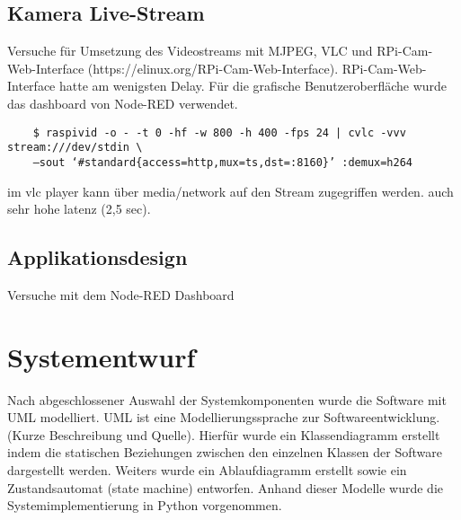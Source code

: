 \documentclass[BMR,Bachelor,ngerman]{twbook}%
\begin{document}
\subsection{Kamera Live-Stream}
Versuche für Umsetzung des Videostreams mit MJPEG, VLC und RPi-Cam-Web-Interface (https://elinux.org/RPi-Cam-Web-Interface). RPi-Cam-Web-Interface hatte am wenigsten Delay. Für die grafische Benutzeroberfläche wurde das dashboard von Node-RED verwendet.

\begin{verbatim}
	$ raspivid -o - -t 0 -hf -w 800 -h 400 -fps 24 | cvlc -vvv stream:///dev/stdin \ 
	—sout ‘#standard{access=http,mux=ts,dst=:8160}’ :demux=h264
\end{verbatim}
im vlc player kann über media/network auf den Stream zugegriffen werden. auch sehr hohe latenz (2,5 sec).
%
\subsection{Applikationsdesign}
Versuche mit dem Node-RED Dashboard
%
\clearpage
\section{Systementwurf}
Nach abgeschlossener Auswahl der Systemkomponenten wurde die Software mit UML modelliert. UML ist eine Modellierungssprache zur Softwareentwicklung. (Kurze Beschreibung und Quelle). Hierfür wurde ein Klassendiagramm erstellt indem die statischen Beziehungen zwischen den einzelnen Klassen der Software dargestellt werden. Weiters wurde ein Ablaufdiagramm erstellt sowie ein Zustandsautomat (state machine) entworfen. Anhand dieser Modelle wurde die Systemimplementierung in Python vorgenommen.
%
\end{document}
